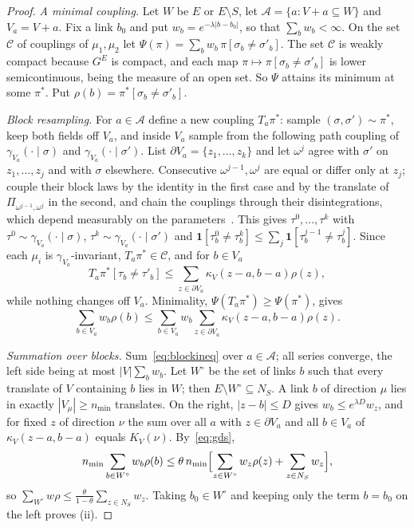 \documentclass[aps,prd,twocolumn,superscriptaddress,nofootinbib,longbibliography,floatfix,amsmath,amssymb,10pt]{revtex4-2}
\theoremstyle{definition}
\theoremstyle{remark}
\begin{document}
\begin{proof}
\emph{A minimal coupling.} Let $W$ be $E$ or $E\setminus S$, let
$\mathcal A=\{a:V+a\subseteq W\}$ and $V_a=V+a$. Fix a link $b_0$ and put
$w_b=e^{-\lambda|b-b_0|}$, so that $\sum_bw_b<\infty$. On the set $\mathcal C$
of couplings of $\mu_1,\mu_2$ let $\Psi(\pi)=\sum_bw_b\,\pi[\sigma_b\ne
\sigma'_b]$. The set $\mathcal C$ is weakly compact because $G^E$ is compact,
and each map $\pi\mapsto\pi[\sigma_b\ne\sigma'_b]$ is lower semicontinuous,
being the measure of an open set. So $\Psi$ attains its minimum at some
$\pi^*$. Put $\rho(b)=\pi^*[\sigma_b\ne\sigma'_b]$.

\emph{Block resampling.} For $a\in\mathcal A$ define a new coupling $T_a\pi^*$:
sample $(\sigma,\sigma')\sim\pi^*$, keep both fields off $V_a$, and inside
$V_a$ sample from the following path coupling of $\gamma_{V_a}(\cdot\mid
\sigma)$ and $\gamma_{V_a}(\cdot\mid\sigma')$. List $\partial V_a=\{z_1,
\dots,z_k\}$ and let $\omega^j$ agree with $\sigma'$ on $z_1,\dots,z_j$ and
with $\sigma$ elsewhere. Consecutive $\omega^{j-1},\omega^j$ are equal or
differ only at $z_j$; couple their block laws by the identity in the first
case and by the translate of $\Pi_{\omega^{j-1},\omega^j}$ in the second, and
chain the couplings through their disintegrations, which depend measurably
on the parameters~\cite[Ch.~3]{Kal21}. This gives $\tau^0,\dots,\tau^k$ with
$\tau^0\sim\gamma_{V_a}(\cdot\mid\sigma)$, $\tau^k\sim\gamma_{V_a}(\cdot\mid
\sigma')$ and $\mathbf 1[\tau^0_b\ne\tau^k_b]\le\sum_j\mathbf 1[\tau^{j-1}_b
\ne\tau^j_b]$. Since each $\mu_i$ is $\gamma_{V_a}$-invariant,
$T_a\pi^*\in\mathcal C$, and for $b\in V_a$
\[
T_a\pi^*[\tau_b\ne\tau'_b]\le\sum_{z\in\partial V_a}\kappa_V(z-a,b-a)\rho(z),
\]
while nothing changes off $V_a$. Minimality, $\Psi(T_a\pi^*)\ge\Psi(\pi^*)$,
gives
\begin{equation}\label{eq:blockineq}
\sum_{b\in V_a}w_b\rho(b)\le\sum_{b\in V_a}w_b\sum_{z\in\partial V_a}
\kappa_V(z-a,b-a)\rho(z).
\end{equation}

\emph{Summation over blocks.} Sum~\eqref{eq:blockineq} over $a\in\mathcal A$;
all series converge, the left side being at most $|V|\sum_bw_b$. Let $W^\circ$
be the set of links $b$ such that every translate of $V$ containing $b$ lies
in $W$; then $E\setminus W^\circ\subseteq N_S$. A link $b$ of direction $\mu$
lies in exactly $|V_\mu|\ge n_{\min}$ translates. On the right, $|z-b|\le D$
gives $w_b\le e^{\lambda D}w_z$, and for fixed $z$ of direction $\nu$ the sum
over all $a$ with $z\in\partial V_a$ and all $b\in V_a$ of $\kappa_V(z-a,b-a)$
equals $K_V(\nu)$. By~\eqref{eq:gds},
\[
n_{\min}\sum_{b\in W^\circ}w_b\rho(b)\le\theta\,n_{\min}\Bigl[\sum_{z\in
W^\circ}w_z\rho(z)+\sum_{z\in N_S}w_z\Bigr],
\]
so $\sum_{W^\circ}w\rho\le\frac{\theta}{1-\theta}\sum_{z\in N_S}w_z$. Taking
$b_0\in W^\circ$ and keeping only the term $b=b_0$ on the left proves (ii).


\end{proof}
\end{document}
